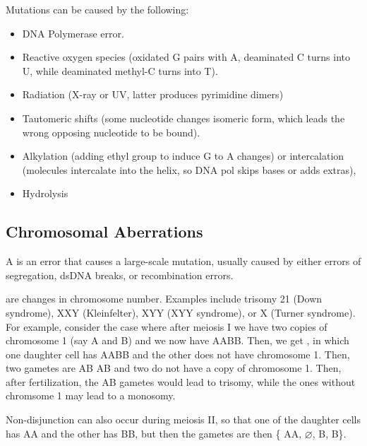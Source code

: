 \begin{fact}
	Mutations can be caused by the following:
	\begin{itemize}
		\item DNA Polymerase error.
		\item Reactive oxygen species (oxidated G pairs with A, deaminated C turns into U, while deaminated methyl-C turns into T).
		\item Radiation (X-ray or UV, latter produces pyrimidine dimers)
		\item Tautomeric shifts (some nucleotide changes isomeric form, which leads the wrong opposing nucleotide to be bound).
		\item Alkylation (adding ethyl group to induce G to A changes) or intercalation (molecules intercalate into the helix, so DNA pol skips bases or adds extras),
		\item Hydrolysis
	\end{itemize}
\end{fact}

\subsection{Chromosomal Aberrations}

\begin{defn}
	A  is an error that causes a large-scale mutation, usually caused by either errors of segregation, dsDNA breaks, or recombination errors.
\end{defn}

\begin{exm}
	 are changes in chromosome number. Examples include trisomy 21 (Down syndrome), XXY (Kleinfelter), XYY (XYY syndrome), or X (Turner syndrome).
	For example, consider the case where after meiosis I we have two copies of chromosome 1 (say A and B) and we now have AABB. Then, we get , in which one daughter cell has AABB and the other does not have chromosome 1. Then, two gametes are AB AB and two do not have a copy of chromosome 1. Then, after fertilization, the AB gametes would lead to trisomy, while the ones without chromsome 1 may lead to a monosomy.

	Non-disjunction can also occur during meiosis II, so that one of the daughter cells has AA and the other has BB, but then the gametes are then \{ AA, $\varnothing$, B, B\}.
\end{exm}

